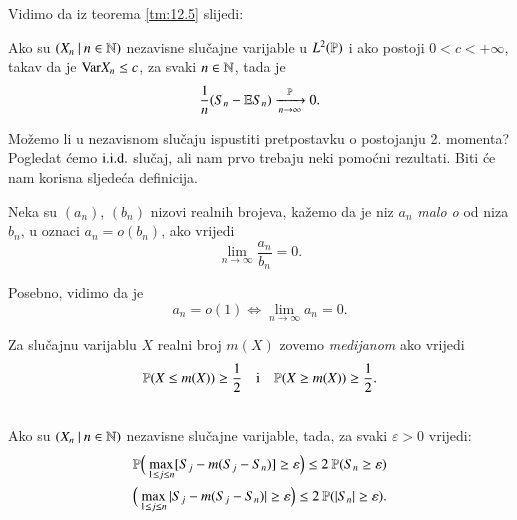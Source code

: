 Vidimo da iz teorema \ref{tm:12.5} slijedi:

\begin{kor} \label{kor:12.6}
    Ako su $({X_n} \: | \: {n \in \mathbb{N}})$ nezavisne slu\v cajne varijable u $L^2(\mathbb{P})$ i ako postoji $0 < c < +\infty$, takav da je $\mathrm{Var} X_n \leq c$, za svaki $n \in \mathbb{N}$, tada je
    \begin{equation*}
        \frac{1}{n} (S_n - \mathbb{E} S_n) \xrightarrow[n \to \infty]{\mathbb{P}} 0.
    \end{equation*}
\end{kor}

Mo\v zemo li u nezavisnom slu\v caju ispustiti pretpostavku o postojanju 2. momenta?
Pogledat \' cemo $\mathrm{i.i.d.}$ slu\v caj, ali nam prvo trebaju neki pomo\' cni rezultati.
Biti \' ce nam korisna sljede\' ca definicija.

\begin{defn}    \label{defn:12.6-1}
    Neka su $(a_n)$, $(b_n)$ nizovi realnih brojeva, ka\v zemo da je niz $a_n$ \emph{malo o} od niza $b_n$, u oznaci $a_n = o(b_n)$, ako vrijedi
    \begin{equation}    \label{jed:12.7}
        \lim\limits_{n \to \infty} \frac{a_n}{b_n} = 0.
    \end{equation}
\end{defn}

Posebno, vidimo da je
\begin{equation*}
    a_n = o(1) \iff \lim\limits_{n \to \infty} a_n = 0.
\end{equation*}

\begin{defn}    \label{defn:12.7-1}
    Za slu\v cajnu varijablu $X$ realni broj $m(X)$ zovemo \emph{medijanom} ako vrijedi
    \begin{equation*}
        \mathbb{P}({X \leq m(X)}) \geq \frac{1}{2} \quad \textnormal{i} \quad \mathbb{P}({X \geq m(X)}) \geq \frac{1}{2}.
    \end{equation*}
\end{defn}

\begin{lm}  \label{lm:12.8}
    \quad \\
    Ako su $({X_n} \: | \: {n \in \mathbb{N}})$ nezavisne slu\v cajne varijable, tada, za svaki $\varepsilon > 0$ vrijedi:
    \begin{equation*}
        \begin{gathered}
            \mathbb{P} \Big( \max\limits_{1 \leq j \leq n} [S_j - m(S_j - S_n)] \geq \varepsilon \Big) \leq 2 \: \mathbb{P} ( S_n \geq \varepsilon )\\
            \Big( \max\limits_{1 \leq j \leq n} |S_j - m(S_j - S_n)| \geq \varepsilon \Big) \leq 2 \: \mathbb{P}({|S_n| \geq \varepsilon}).
        \end{gathered}
    \end{equation*}
\end{lm}

